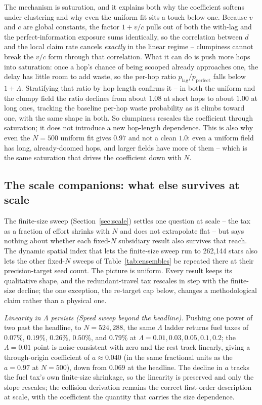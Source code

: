 The mechanism is saturation, and it explains both why the coefficient softens under clustering and
why even the uniform fit sits a touch below one. Because
$v$ and $c$ are global constants, the factor $1 + v/c$ pulls out of both the with-lag and the
perfect-information exposure sums identically, so the correlation between $d$ and the local claim rate
cancels \emph{exactly} in the linear regime -- clumpiness cannot break the $v/c$ form through that
correlation. What it can do is push more hops into saturation: once a hop's chance of being scooped
already approaches one, the delay has little room to add waste, so the per-hop ratio
$p_{\text{lag}}/p_{\text{perfect}}$ falls below $1 + \Lambda$. Stratifying that ratio by hop length
confirms it -- in both the uniform and the clumpy field the ratio declines from about $1.08$ at short
hops to about $1.00$ at long ones, tracking the baseline per-hop waste probability as it climbs toward
one, with the same shape in both. So clumpiness rescales the coefficient through saturation; it does
not introduce a new hop-length dependence. This is also why even the $N = 500$ uniform fit gives
$0.97$ and not a clean $1.0$: even a uniform field has long, already-doomed hops, and larger fields
have more of them -- which is the same saturation that drives the coefficient down with $N$.

\subsection{The scale companions: what else survives at scale}
\label{sec:scale-companions}
The finite-size sweep (Section~\ref{sec:scale}) settles one question at scale -- the tax as a
fraction of effort shrinks with $N$ and does not extrapolate flat -- but says nothing about whether
each fixed-$N$ subsidiary result also survives that reach. The dynamic spatial index that lets the
finite-size sweep run to 262{,}144 stars also lets the other fixed-$N$ sweeps of
Table~\ref{tab:ensembles} be repeated there at their precision-target seed count. The picture is uniform. Every result keeps its qualitative shape, and the
redundant-travel tax rescales in step with the finite-size decline; the one exception, the re-target
cap below, changes a methodological claim rather than a physical one.

\emph{Linearity in $\Lambda$ persists (Speed sweep beyond the headline).} Pushing one power of two
past the headline, to $N = 524{,}288$, the same $\Lambda$ ladder returns fuel taxes of $0.07\%$,
$0.19\%$, $0.26\%$, $0.50\%$, and $0.79\%$ at $\Lambda = 0.01, 0.03, 0.05, 0.1, 0.2$; the
$\Lambda = 0.01$ point is noise-consistent with zero and the rest track linearly, giving a
through-origin coefficient of $a \approx 0.040$ (in the same fractional units as the $a = 0.97$ at
$N = 500$), down from $0.069$ at the headline. The decline in $a$ tracks the fuel tax's own
finite-size shrinkage, so the linearity is preserved and only the slope rescales; the collision
derivation remains the correct first-order description at scale, with the coefficient the quantity
that carries the size dependence.

